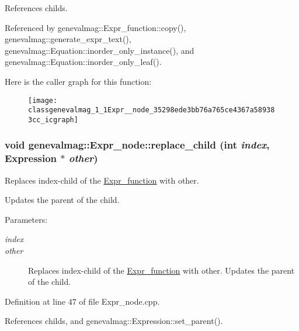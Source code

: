 References childs.

Referenced by genevalmag::Expr\_\-function::copy(), genevalmag::generate\_\-expr\_\-text(), genevalmag::Equation::inorder\_\-only\_\-instance(), and genevalmag::Equation::inorder\_\-only\_\-leaf().

Here is the caller graph for this function:\nopagebreak
\begin{figure}[H]
\begin{center}
\leavevmode
\texttt{[image: classgenevalmag\_1\_1Expr\_\_node\_35298ede3bb76a765ce4367a589383cc\_icgraph]}
\end{center}
\end{figure}
\hypertarget{classgenevalmag_1_1Expr__node_951f8db517c231456781d10961ef8dba}{
\subsubsection[{replace\_\-child}]{\setlength{\rightskip}{0pt plus 5cm}void genevalmag::Expr\_\-node::replace\_\-child (int {\em index}, \/  {\bf Expression} $\ast$ {\em other})}}
\label{classgenevalmag_1_1Expr__node_951f8db517c231456781d10961ef8dba}


Replaces index-child of the \hyperlink{classgenevalmag_1_1Expr__function}{Expr\_\-function} with other.\par
 Updates the parent of the child. \begin{Desc}
\item[Parameters:]
\begin{description}
\item[{\em index}]\item[{\em other}]Replaces index-child of the \hyperlink{classgenevalmag_1_1Expr__function}{Expr\_\-function} with other. Updates the parent of the child. \end{description}
\end{Desc}


Definition at line 47 of file Expr\_\-node.cpp.

References childs, and genevalmag::Expression::set\_\-parent().

